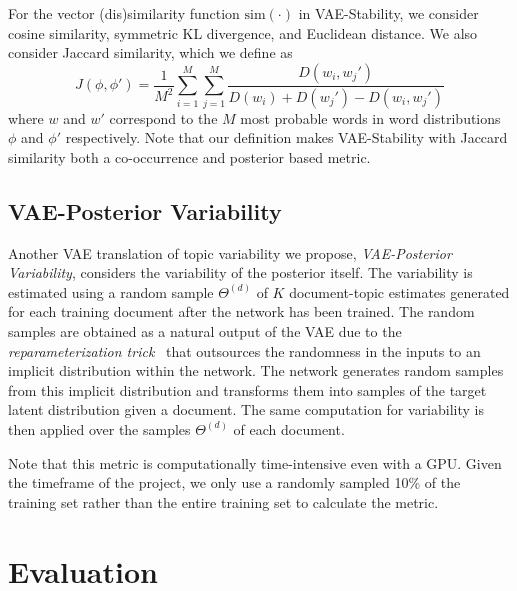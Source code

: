 \documentclass[10pt]{article}
\begin{document}
For the vector (dis)similarity function $\textrm{sim}(\cdot)$ in VAE-Stability, we consider cosine similarity, symmetric KL divergence, and Euclidean distance. We also consider Jaccard similarity, which we define as
\[
J(\phi,\phi') = \frac{1}{M^2}\sum_{i=1}^M\sum_{j=1}^{M}\frac{D(w_i,w_j')}{D(w_i)+D(w_j')-D(w_i,w_j')}
\]
where $w$ and $w'$ correspond to the $M$ most probable words in word distributions $\phi$ and $\phi'$ respectively. Note that our definition makes VAE-Stability with Jaccard similarity both a co-occurrence and posterior based metric.

\subsection{VAE-Posterior Variability}

Another VAE translation of topic variability we propose, \textit{VAE-Posterior Variability}, considers the variability of the posterior itself. The variability is estimated using a random sample $\Theta^{(d)}$ of $K$ document-topic estimates generated for each training document after the network has been trained. The random samples are obtained as a natural output of the VAE due to the \textit{reparameterization trick}~\cite{Kingma:2013} that outsources the randomness in the inputs to an implicit distribution within the network. The network generates random samples from this implicit distribution and transforms them into samples of the target latent distribution given a document. The same computation for variability is then applied over the samples $\Theta^{(d)}$ of each document.

Note that this metric is computationally time-intensive even with a GPU. Given the timeframe of the project, we only use a randomly sampled 10\% of the training set rather than the entire training set to calculate the metric.

\section{Evaluation}
\end{document}
